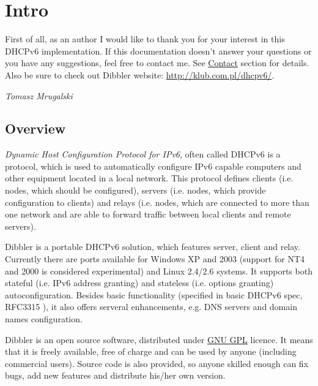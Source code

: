 
\section{Intro}
First of all, as an author I would like to thank you for your interest
in this DHCPv6 implementation. If this documentation doesn't answer
your questions or you have any suggestions, feel free to contact
me. See \hyperlink{contact}{Contact} section for details. Also be sure
to check out Dibbler website: \url{http://klub.com.pl/dhcpv6/}.

\begin{flushright}
\emph{Tomasz Mrugalski}
\end{flushright}

\subsection{Overview}

\emph{Dynamic Host Configuration Protocol for IPv6}, often called
DHCPv6 is a protocol, which is used to automatically configure IPv6
capable computers and other equipment located in a local network. This
protocol defines clients (i.e. nodes, which should be configured),
servers (i.e. nodes, which provide configuration to clients) and
relays (i.e. nodes, which are connected to more than one network and
are able to forward traffic between local clients and remote servers).

Dibbler is a portable DHCPv6 solution, which features server, client and
relay. Currently there are ports available for Windows XP and 2003 (support for
NT4 and 2000 is considered experimental) and Linux 2.4/2.6 systems. 
It supports both stateful (i.e. IPv6 address granting) and stateless
(i.e. options granting) autoconfiguration. Besides basic
functionality (specified in basic DHCPv6 spec, RFC3315 \cite{rfc3315}),
it also offers serveral enhancements, e.g. DNS servers and domain names
configuration.

Dibbler is an open source software, distributed under
\href{http://www.gnu.org/copyleft/gpl.html}{GNU GPL} licence. It means 
that it is freely available, free of charge and can be used by anyone
(including commercial users). Source code is also provided, so anyone
skilled enough can fix bugs, add new features and distribute his/her
own version.

